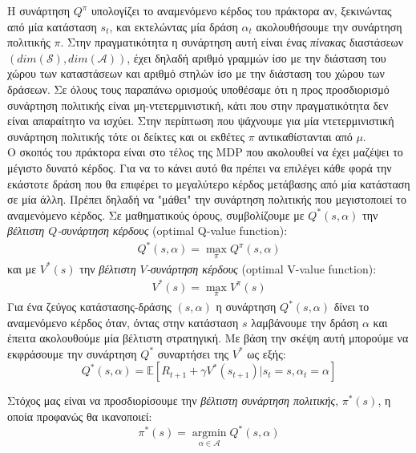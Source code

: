 \documentclass[11pt]{article} %
\numberwithin{equation}{subsection}
\begin{document}
Η συνάρτηση $Q^\pi$ υπολογίζει το αναμενόμενο κέρδος του πράκτορα αν, ξεκινώντας από μία κατάσταση $s_t$, και εκτελώντας μία δράση $\alpha_t$ ακολουθήσουμε την συνάρτηση πολιτικής $\mathcal{\pi}$. Στην πραγματικότητα η συνάρτηση αυτή είναι ένας \textit{πίνακας} διαστάσεων $(dim(\mathcal{S}), dim(\mathcal{A}))$, έχει δηλαδή αριθμό γραμμών ίσο με την διάσταση του χώρου των καταστάσεων και αριθμό στηλών ίσο με την διάσταση του χώρου των δράσεων. Σε όλους τους παραπάνω ορισμούς υποθέσαμε ότι η προς προσδιορισμό συνάρτηση πολιτικής είναι μη-ντετερμινιστική, κάτι που στην πραγματικότητα δεν είναι απαραίτητο να ισχύει. Στην περίπτωση που ψάχνουμε για μία ντετερμινιστική συνάρτηση πολιτικής τότε οι δείκτες και οι εκθέτες $\pi$ αντικαθίστανται από $\mu$.\\

Ο σκοπός του πράκτορα είναι στο τέλος της MDP που ακολουθεί να έχει μαζέψει το μέγιστο δυνατό κέρδος. Για να το κάνει αυτό θα πρέπει να επιλέγει κάθε φορά την εκάστοτε δράση που θα επιφέρει το μεγαλύτερο κέρδος μετάβασης από μία κατάσταση σε μία άλλη. Πρέπει δηλαδή να "μάθει" την συνάρτηση πολιτικής που μεγιστοποιεί το αναμενόμενο κέρδος. Σε μαθηματικούς όρους, συμβολίζουμε με $Q^*(s,\alpha)$ την \textit{βέλτιστη $Q$-συνάρτηση κέρδους} (optimal Q-value function):
\begin{align*}
Q^*(s,\alpha) = \max_{\mathcal{\pi}} Q^\pi(s,\alpha)
\end{align*}
και με $V^{*}(s)$ την \textit{βέλτιστη $V$-συνάρτηση κέρδους} (optimal V-value function):
\begin{align*}
V^{*}(s) =  \max_{\mathcal{\pi}} V^{\pi}(s)
\end{align*}
Για ένα ζεύγος κατάστασης-δράσης $(s, \alpha)$ η συνάρτηση $Q^{*}(s, \alpha)$ δίνει το αναμενόμενο κέρδος όταν, όντας στην κατάσταση $s$ λαμβάνουμε την δράση $\alpha$ και έπειτα ακολουθούμε μία βέλτιστη στρατηγική. Με βάση την σκέψη αυτή μπορούμε να εκφράσουμε την συνάρτηση $Q^{*}$ συναρτήσει της $V^{*}$ ως εξής:
\begin{equation}
Q^{*}(s, \alpha) = \mathbb{E} \left[R_{t+1} + \gamma V^{*}(s_{t+1}) | s_{t} = s, \alpha_{t} = \alpha \right]
\end{equation}

Στόχος μας είναι να προσδιορίσουμε την \textit{βέλτιστη συνάρτηση πολιτικής}, $\pi ^* (s)$, η οποία προφανώς θα ικανοποιεί:
\begin{equation}
\pi^* (s) = \operatorname*{argmin}_{\alpha \in \mathcal{A}} Q^* (s,\alpha)
\end{equation}
\end{document}
